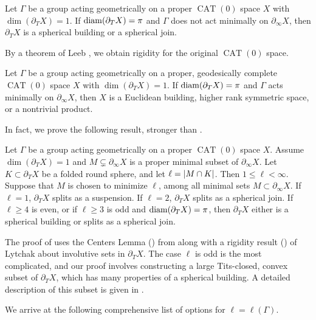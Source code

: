 \documentclass{amsart}
\newcommand{\bdT}{\partial_T}
\newcommand{\bdc}{\partial_{\infty}}
\DeclareMathOperator{\CAT}{CAT}
\begin{document}
\begin{maintheorem}	\label{MC1}
Let $\Gamma$ be a group acting geometrically on a proper $\CAT(0)$ space $X$
with $\dim(\bdT X) = 1$.
If $\diam (\bdT X) = \pi$ and $\Gamma$ does not act minimally on $\bdc X$, then $\bdT X$ is a spherical building or a spherical join. \end{maintheorem}

By a theorem of Leeb \cite{leeb}, we obtain rigidity for the original $\CAT(0)$ space.

\begin{maincorollary}	\label{MC2}
Let $\Gamma$ be a group acting geometrically on a proper, geodesically complete $\CAT(0)$ space $X$ with $\dim(\bdT X) = 1$.
If $\diam (\bdT X) = \pi$ and $\Gamma$ acts minimally on $\bdc X$, then $X$ is a Euclidean building, higher rank symmetric space, or a nontrivial product. \end{maincorollary}

In fact, we prove the following result, stronger than .

\begin{maintheorem}	\label{MT}
Let $\Gamma$ be a group acting geometrically on a proper $\CAT(0)$ space $X$.
Assume $\dim(\bdT X) = 1$ and $M \subsetneq \bdc X$ is a proper minimal subset of $\bdc X$.  Let $K \subset \bdT X$ be a folded round sphere, and let $\ell = \left| M \cap K \right|$.  Then $1 \le \ell < \infty$.  Suppose that $M$ is chosen to minimize $\ell$, among all minimal sets $M \subset \bdc X$.  If $\ell = 1$, $\bdT X$ splits as a suspension.  If $\ell = 2$, $\bdT X$ splits as a spherical join.  If $\ell \ge 4$ is even, or if $\ell \ge 3$ is odd and $\diam (\bdT X) = \pi$, then $\bdT X$ either is a spherical building or splits as a spherical join. \end{maintheorem}

The proof of  uses the Centers Lemma () from \cite{ricks-radius} along with a rigidity result () of Lytchak \cite{lytchak05} about involutive sets in $\bdT X$.
The case $\ell$ is odd is the most complicated, and our proof involves constructing a large Tits-closed, convex subset of $\bdT X$, which has many properties of a spherical building.
A detailed description of this subset is given in .


We arrive at the following comprehensive list of options for $\ell = \ell(\Gamma)$.
\end{document}
